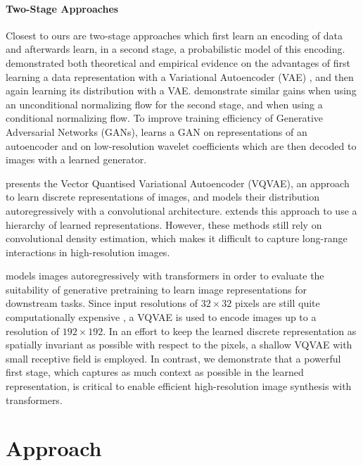\paragraph{Two-Stage Approaches} Closest to ours are two-stage approaches which first learn an encoding of data and afterwards learn, in a second stage, a probabilistic model of this encoding. \cite{dai2019diagnosing} demonstrated both theoretical and empirical evidence on the advantages of first learning a data representation with a Variational Autoencoder (VAE) \cite{vae,vae2}, and then again learning its distribution with a VAE. \cite{esser2020invertible,xiao2019generative} demonstrate similar gains when using an unconditional normalizing flow for the second stage, and \cite{rombach2020making,rombach2020network} when using a conditional normalizing flow. To improve training efficiency of Generative Adversarial Networks (GANs), \cite{liu2019acceleration} learns a GAN \cite{gan} on representations of an autoencoder and \cite{han2020notsobiggan} on low-resolution wavelet coefficients which are then decoded to images with a learned generator.

\cite{oord2018neural} presents the Vector Quantised Variational Autoencoder (VQVAE), an approach to learn discrete representations of images, and models their distribution autoregressively with a convolutional architecture. \cite{razavi2019generating} extends this approach to use a hierarchy of learned representations. However, these methods still rely on convolutional density estimation, which makes it difficult to capture long-range interactions in high-resolution images.

\cite{chen2020generative} models images autoregressively with transformers in order to evaluate the suitability of generative pretraining to learn image representations for downstream tasks. Since input resolutions of $32\times 32$ pixels are still quite computationally expensive \cite{chen2020generative}, a VQVAE is used to encode images up to a resolution of $192\times 192$. In an effort to keep the learned discrete representation as spatially invariant as possible with respect to the pixels, a shallow VQVAE with small receptive field is employed. In contrast, we demonstrate that a powerful first stage, which captures as much context as possible in the learned representation, is critical to enable efficient high-resolution image synthesis with transformers.

\section{Approach}
\label{sec:approach} 

